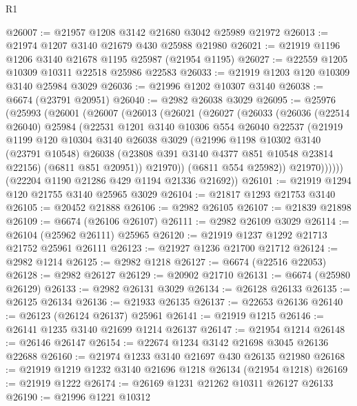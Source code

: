 \begin{lexlean}{R1}
\begin{coremodule}
@26007 := @21957 @1208 @3142 @21680 @3042 @25989 @21972
@26013 := @21974 @1207 @3140 @21679 @430 @25988 @21980
@26021 := @21919 @1196 @1206 @3140 @21678 @1195 @25987 (@21954 @1195)
@26027 := @22559 @1205 @10309 @10311 @22518 @25986 @22583
@26033 := @21919 @1203 @120 @10309 @3140 @25984 @3029
@26036 := @21996 @1202 @10307 @3140
@26038 := @6674 (@23791 @20951)
@26040 := @2982 @26038 @3029
@26095 := @25976
    (@25993
      (@26001
        (@26007
          (@26013
            (@26021
              (@26027
                (@26033
                  (@26036
                    (@22514 @26040)
                    @25984
                    (@22531
                      @1201
                      @3140
                      @10306
                      @554
                      @26040
                      @22537
                      (@21919
                        @1199
                        @120
                        @10304
                        @3140
                        @26038
                        @3029
                        (@21996
                          @1198
                          @10302
                          @3140
                          (@23791 @10548)
                          @26038
                          (@23808 @391 @3140 @4377 @851 @10548 @23814 @22156)
                          (@6811 @851 @20951))
                        @21970))
                    (@6811 @554 @25982))
                  @21970))))))
      (@22204 @1190 @21286 @429 @1194 @21336 @21692))
@26101 := @21919 @1294 @120 @21755 @3140 @25965 @3029
@26104 := @21817 @1293 @21753 @3140
@26105 := @20452 @21888
@26106 := @2982 @26105
@26107 := @21839 @21898
@26109 := @6674 (@26106 @26107)
@26111 := @2982 @26109 @3029
@26114 := @26104 (@25962 @26111) @25965
@26120 := @21919 @1237 @1292 @21713 @21752 @25961 @26111
@26123 := @21927 @1236 @21700 @21712
@26124 := @2982 @1214
@26125 := @2982 @1218
@26127 := @6674 (@22516 @22053)
@26128 := @2982 @26127
@26129 := @20902 @21710
@26131 := @6674 (@25980 @26129)
@26133 := @2982 @26131 @3029
@26134 := @26128 @26133
@26135 := @26125 @26134
@26136 := @21933 @26135
@26137 := @22653 @26136
@26140 := @26123 (@26124 @26137) @25961
@26141 := @21919 @1215
@26146 := @26141 @1235 @3140 @21699 @1214 @26137
@26147 := @21954 @1214
@26148 := @26146 @26147
@26154 := @22674 @1234 @3142 @21698 @3045 @26136 @22688
@26160 := @21974 @1233 @3140 @21697 @430 @26135 @21980
@26168 := @21919 @1219 @1232 @3140 @21696 @1218 @26134 (@21954 @1218)
@26169 := @21919 @1222
@26174 := @26169 @1231 @21262 @10311 @26127 @26133
@26190 := @21996
    @1221
    @10312

\end{coremodule}
\end{lexlean}
